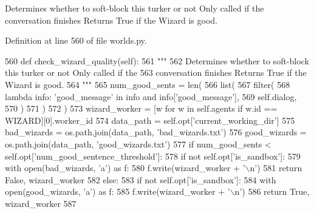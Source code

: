 \begin{DoxyVerb}Determines whether to soft-block this turker or not Only called if the
conversation finishes Returns True if the Wizard is good.
\end{DoxyVerb}
 

Definition at line 560 of file worlds.\+py.


\begin{DoxyCode}
560     \textcolor{keyword}{def }check\_wizard\_quality(self):
561         \textcolor{stringliteral}{"""}
562 \textcolor{stringliteral}{        Determines whether to soft-block this turker or not Only called if the}
563 \textcolor{stringliteral}{        conversation finishes Returns True if the Wizard is good.}
564 \textcolor{stringliteral}{        """}
565         num\_good\_sents = len(
566             list(
567                 filter(
568                     \textcolor{keyword}{lambda} info: \textcolor{stringliteral}{'good\_message'} \textcolor{keywordflow}{in} info \textcolor{keywordflow}{and} info[\textcolor{stringliteral}{'good\_message'}],
569                     self.dialog,
570                 )
571             )
572         )
573         wizard\_worker = [w \textcolor{keywordflow}{for} w \textcolor{keywordflow}{in} self.agents \textcolor{keywordflow}{if} w.id == WIZARD][0].worker\_id
574         data\_path = self.opt[\textcolor{stringliteral}{'current\_working\_dir'}]
575         bad\_wizards = os.path.join(data\_path, \textcolor{stringliteral}{'bad\_wizards.txt'})
576         good\_wizards = os.path.join(data\_path, \textcolor{stringliteral}{'good\_wizards.txt'})
577         \textcolor{keywordflow}{if} num\_good\_sents < self.opt[\textcolor{stringliteral}{'num\_good\_sentence\_threshold'}]:
578             \textcolor{keywordflow}{if} \textcolor{keywordflow}{not} self.opt[\textcolor{stringliteral}{'is\_sandbox'}]:
579                 with open(bad\_wizards, \textcolor{stringliteral}{'a'}) \textcolor{keyword}{as} f:
580                     f.write(wizard\_worker + \textcolor{stringliteral}{'\(\backslash\)n'})
581             \textcolor{keywordflow}{return} \textcolor{keyword}{False}, wizard\_worker
582         \textcolor{keywordflow}{else}:
583             \textcolor{keywordflow}{if} \textcolor{keywordflow}{not} self.opt[\textcolor{stringliteral}{'is\_sandbox'}]:
584                 with open(good\_wizards, \textcolor{stringliteral}{'a'}) \textcolor{keyword}{as} f:
585                     f.write(wizard\_worker + \textcolor{stringliteral}{'\(\backslash\)n'})
586             \textcolor{keywordflow}{return} \textcolor{keyword}{True}, wizard\_worker
587 
\end{DoxyCode}
